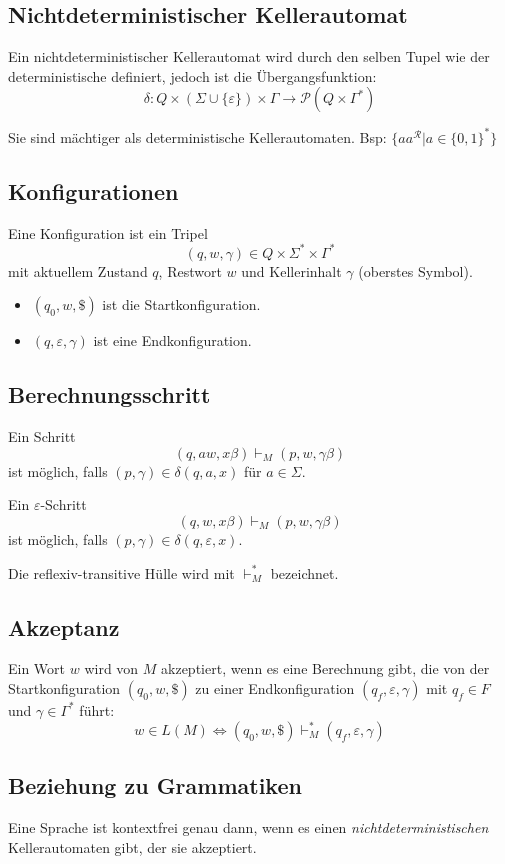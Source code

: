 \subsection{Nichtdeterministischer Kellerautomat}
Ein nichtdeterministischer Kellerautomat wird durch den selben Tupel wie der deterministische definiert, jedoch ist die Übergangsfunktion:
\[
    \delta : Q \times (\Sigma \cup \{\varepsilon\}) \times \Gamma \to \mathcal{P}(Q \times \Gamma^*)
\]

Sie sind mächtiger als deterministische Kellerautomaten. Bsp: \(\{aa^{\mathcal{R}}|a \in \{0,1\}^*\}\)

\subsection{Konfigurationen}
Eine Konfiguration ist ein Tripel
\[
    (q,w,\gamma) \in Q \times \Sigma^* \times \Gamma^*
\]
mit aktuellem Zustand \(q\), Restwort \(w\) und Kellerinhalt \(\gamma\) (oberstes Symbol).
\begin{itemize}
    \item \((q_0,w,\$)\) ist die Startkonfiguration.
    \item \((q,\varepsilon,\gamma)\) ist eine Endkonfiguration.
\end{itemize}

\subsection{Berechnungsschritt}
Ein Schritt
\[
    (q,aw,x\beta) \vdash_M (p,w,\gamma\beta)
\]
ist möglich, falls \((p,\gamma) \in \delta(q,a,x)\) für \(a \in \Sigma\).

Ein \(\varepsilon\)-Schritt
\[
    (q,w,x\beta) \vdash_M (p,w,\gamma\beta)
\]
ist möglich, falls \((p,\gamma) \in \delta(q,\varepsilon,x)\).

Die reflexiv-transitive Hülle wird mit \(\vdash_M^*\) bezeichnet.

\subsection{Akzeptanz}
Ein Wort \(w\) wird von \(M\) akzeptiert, wenn es eine Berechnung gibt, die von der Startkonfiguration \((q_0,w,\$)\) zu einer Endkonfiguration \((q_f,\varepsilon,\gamma)\) mit \(q_f \in F\) und \(\gamma \in \Gamma^*\) führt:
\[
    w \in L(M) \iff (q_0,w,\$) \vdash_M^* (q_f,\varepsilon,\gamma)
\]

\subsection{Beziehung zu Grammatiken}
Eine Sprache ist kontextfrei genau dann, wenn es einen \textit{nichtdeterministischen} Kellerautomaten gibt, der sie akzeptiert.
